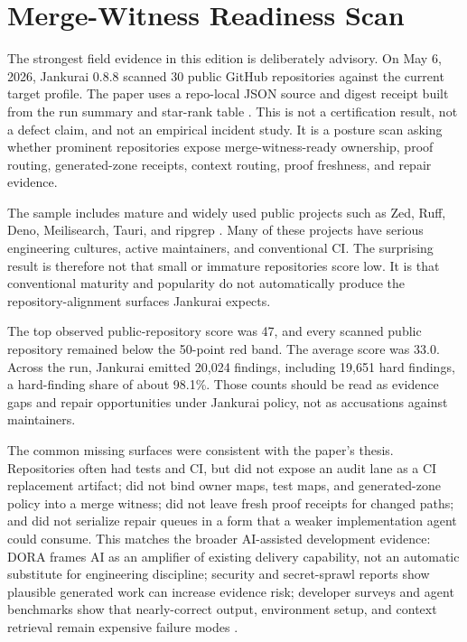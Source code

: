 

\section{Merge-Witness Readiness Scan}

The strongest field evidence in this edition is deliberately advisory. On May 6, 2026, Jankurai 0.8.8 scanned 30 public GitHub repositories against the current target profile. The paper uses a repo-local JSON source and digest receipt built from the run summary and star-rank table \cite{jankuraiPublicRepoRun2026}. This is not a certification result, not a defect claim, and not an empirical incident study. It is a posture scan asking whether prominent repositories expose merge-witness-ready ownership, proof routing, generated-zone receipts, context routing, proof freshness, and repair evidence.

The sample includes mature and widely used public projects such as Zed, Ruff, Deno, Meilisearch, Tauri, and ripgrep \cite{zedGithub2026,ruffGithub2026,denoGithub2026,meilisearchGithub2026,tauriGithub2026,ripgrepGithub2026}. Many of these projects have serious engineering cultures, active maintainers, and conventional CI. The surprising result is therefore not that small or immature repositories score low. It is that conventional maturity and popularity do not automatically produce the repository-alignment surfaces Jankurai expects.

The top observed public-repository score was 47, and every scanned public repository remained below the 50-point red band. The average score was 33.0. Across the run, Jankurai emitted 20,024 findings, including 19,651 hard findings, a hard-finding share of about 98.1\%. Those counts should be read as evidence gaps and repair opportunities under Jankurai policy, not as accusations against maintainers.

\PublicRepoScoreAggregateTable

The common missing surfaces were consistent with the paper's thesis. Repositories often had tests and CI, but did not expose an audit lane as a CI replacement artifact; did not bind owner maps, test maps, and generated-zone policy into a merge witness; did not leave fresh proof receipts for changed paths; and did not serialize repair queues in a form that a weaker implementation agent could consume. This matches the broader AI-assisted development evidence: DORA frames AI as an amplifier of existing delivery capability, not an automatic substitute for engineering discipline; security and secret-sprawl reports show plausible generated work can increase evidence risk; developer surveys and agent benchmarks show that nearly-correct output, environment setup, and context retrieval remain expensive failure modes \cite{doraStateAIAssistedSoftwareDevelopment2025,veracodeGenaiCodeSecurity2025,gitguardianSecretsSprawl2026,gitguardianSecretsSprawl2026Blog,stackOverflowAISurvey2025,sweAgentAci2024,setupBench2025,contextBench2026}.

